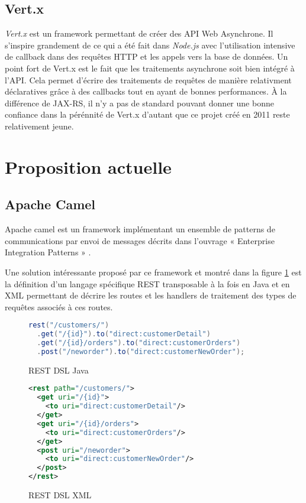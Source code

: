 \documentclass[a4paper, 11pt]{report}
\begin{document}
\subsection{Vert.x}

\emph{Vert.x} est un framework permettant de créer des API Web
Asynchrone.  Il s'inspire grandement de ce qui a été fait dans
\emph{Node.js} avec l'utilisation intensive de callback dans des
requêtes HTTP et les appels vers la base de données. Un point fort de
Vert.x est le fait que les traitements asynchrone soit bien intégré à
l'API. Cela permet d'écrire des traitements de requêtes de manière
relativment déclaratives grâce à des callbacks tout en ayant de bonnes
performances.  À la différence de JAX-RS, il n'y a pas de standard
pouvant donner une bonne confiance dans la pérénnité de Vert.x
d'autant que ce projet créé en 2011 reste relativement jeune.

\section{Proposition actuelle}

\subsection{Apache Camel}

Apache camel est un framework implémentant un ensemble de patterns de
communications par envoi de messages décrits dans l'ouvrage «
Enterprise Integration Patterns » \cite{hohpe2003enterprise}.

Une solution intéressante proposé par ce framework et montré dans la
figure \ref{fig:restdsl} est la définition d'un langage spécifique REST
transposable à la fois en Java et en XML permettant de décrire les
routes et les handlers de traitement des types de requêtes associés à
ces routes.

\begin{figure}
  \ContinuedFloat*
  \begin{lstlisting}[language=java]
rest("/customers/")
  .get("/{id}").to("direct:customerDetail")
  .get("/{id}/orders").to("direct:customerOrders")
  .post("/neworder").to("direct:customerNewOrder");
  \end{lstlisting}
  \caption{REST DSL Java}
\end{figure}

\begin{figure}
  \ContinuedFloat
  \begin{lstlisting}[language=xml]
<rest path="/customers/">
  <get uri="/{id}">
    <to uri="direct:customerDetail"/>
  </get>
  <get uri="/{id}/orders">
    <to uri="direct:customerOrders"/>
  </get>
  <post uri="/neworder">
    <to uri="direct:customerNewOrder"/>
  </post>
</rest>
  \end{lstlisting}
  \caption{REST DSL XML}
  \label{fig:restdsl}
\end{figure}


\clearpage


\end{document}
